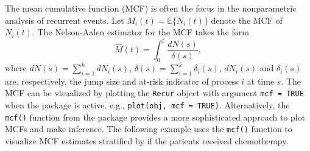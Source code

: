 The mean cumulative function (MCF) is often the focus in the
nonparametric analysis of recurrent events. Let
\(M_i(t)=\mathbb{E}\{N_i(t)\}\) denote the MCF of \(N_i(t)\). The
Nelson-Aalen estimator \citep{nelson2003siam} for the MCF takes the form
\[\widehat{M}(t) = \int_0^t \frac{dN(s)}{\delta(s)},\] where
\(dN(s)=\sum_{i=1}^k dN_i(s)\),
\(\delta(s) = \sum_{i=1}^k \delta_i(s)\), \(dN_i(s)\) and
\(\delta_i(s)\) are, respectively, the jump size and at-risk indicator
of process \(i\) at time \(s\). The MCF can be visualized by plotting
the \texttt{Recur} object with argument \texttt{mcf\ =\ TRUE} when the
 package is active, e.g., \texttt{plot(obj,\ mcf\ =\ TRUE)}.
Alternatively, the \texttt{mcf()} function from the  package
provides a more sophisticated approach to plot MCFs and make inference.
The following example uses the \texttt{mcf()} function to visualize MCF
estimates stratified by if the patients received chemotherapy.

\begin{Shaded}
\begin{Highlighting}[]
\StringTok{ } 
 \NormalTok{, } \NormalTok{:}\NormalTok{) +}
\StringTok{    }\NormalTok{(} \NormalTok{) }
\end{Highlighting}
\end{Shaded}

